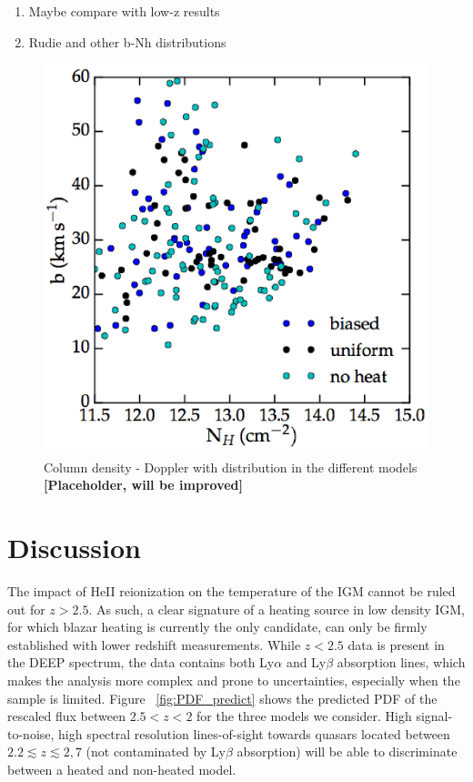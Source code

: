 \documentclass[numberedappendix]{emulateapj}
\newcommand\ALc[1]{{\color{red} \bf #1}} %
\begin{document}
\begin{enumerate}
\item Maybe compare with low-z results
\item Rudie and other b-Nh distributions
\end{enumerate}
\begin{figure}
\centering
\includegraphics[width = .45\textwidth ]{b_Nh}
\caption{ Column density - Doppler with distribution in the different models \ALc{[Placeholder, will be improved]}}
\label{fig:b_Nh}
\end{figure}



\section{Discussion}\label{sec:discussion}

The impact of HeII reionization on the temperature of the IGM cannot be ruled out for $z>2.5$. As such, a clear signature of a heating source in low density IGM, for which blazar heating is currently the only candidate, can only be firmly established with lower redshift measurements. While $z<2.5$ data is present in the DEEP spectrum, the data contains both Ly$\alpha$ and Ly$\beta$ absorption lines, which makes the analysis more complex and prone to uncertainties, especially when the sample is limited. Figure ~\ref{fig:PDF_predict} shows the predicted PDF of the rescaled flux between $2.5<z<2$ for the three models we consider. High signal-to-noise, high spectral resolution lines-of-sight towards quasars located between $2.2\lesssim z \lesssim 2,7$ (not contaminated by Ly$\beta$ absorption) will be able to discriminate between a heated and non-heated model. 
\end{document}
